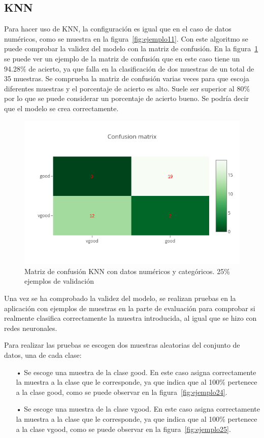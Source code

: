 \documentclass[a4paper, 12pt]{book}
\begin{document}
\subsection{KNN}
\label{subsec:knn2}

Para hacer uso de KNN, la configuración es igual que en el caso de datos numéricos, como se muestra en la figura~\ref{fig:ejemplo11}. Con este algoritmo se puede comprobar la validez del modelo con la matriz de confusión. En la figura~\ref{fig:ejemplo23} se puede ver un ejemplo de la matriz de confusión que en este caso tiene un 94.28\% de acierto, ya que falla en la clasificación de dos muestras de un total de 35 muestras. Se comprueba la matriz de confusión varias veces para que escoja diferentes muestras y el porcentaje de acierto es alto. Suele ser superior al 80\% por lo que se puede considerar un porcentaje de acierto bueno. Se podría decir que el modelo se crea correctamente.

\begin{figure}
	\centering
	\includegraphics[width=12cm, keepaspectratio]{img/cm_numycat_knn.png}
	\caption{Matriz de confusión KNN con datos numéricos y categóricos. 25\% ejemplos de validación} 	
	\label{fig:ejemplo23}
\end{figure}

Una vez se ha comprobado la validez del modelo, se realizan pruebas en la aplicación con ejemplos de muestras en la parte de evaluación para comprobar si realmente clasifica correctamente la muestra introducida, al igual que se hizo con redes neuronales.

Para realizar las pruebas se escogen dos muestras aleatorias del conjunto de datos, una de cada clase:

\begin{itemize}
\item[•] Se escoge una muestra de la clase good. En este caso asigna correctamente la muestra a la clase que le corresponde, ya que indica que al 100\% pertenece a la clase good, como se puede observar en la figura~\ref{fig:ejemplo24}.
\item[•] Se escoge una muestra de la clase vgood. En este caso asigna correctamente la muestra a la clase que le corresponde, ya que indica que al 100\% pertenece a la clase vgood, como se puede observar en la figura~\ref{fig:ejemplo25}.
\end{itemize}
\end{document}
